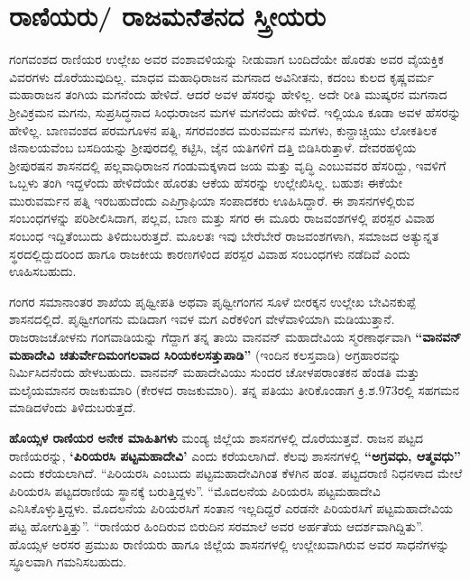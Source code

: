 \section{ರಾಣಿಯರು/ ರಾಜಮನೆತನದ ಸ್ತ್ರೀಯರು}

ಗಂಗವಂಶದ ರಾಣಿಯರ ಉಲ್ಲೇಖ ಅವರ ವಂಶಾವಳಿಯನ್ನು ನೀಡುವಾಗ ಬಂದಿದೆಯೇ ಹೊರತು ಅವರ ವೈಯಕ್ತಿಕ ವಿವರಗಳು ದೊರೆಯುವುದಿಲ್ಲ. ಮಾಧವ ಮಹಾಧಿರಾಜನ ಮಗನಾದ ಅವಿನೀತನು, ಕದಂಬ ಕುಲದ ಕೃಷ್ಣವರ್ಮ ಮಹಾರಾಜನ ತಂಗಿಯ ಮಗನೆಂದು ಹೇಳಿದೆ. ಆದರೆ ಅವಳ ಹೆಸರನ್ನು ಹೇಳಿಲ್ಲ. ಅದೇ ರೀತಿ ಮುಷ್ಕರನ ಮಗನಾದ ಶ‍್ರೀವಿಕ್ರಮನ ಮಗನು, ಸುಪ್ರಸಿದ್ಧನಾದ ಸಿಂಧುರಾಜನ ಮಗಳ ಮಗನೆಂದು ಹೇಳಿದೆ. ಇಲ್ಲಿಯೂ ಕೂಡಾ ಅವಳ ಹೆಸರನ್ನು ಹೇಳಿಲ್ಲ. ಬಾಣವಂಶದ ಪರಮಗೂಳನ ಪತ್ನಿ, ಸಗರವಂಶದ ಮರುವರ್ಮನ ಮಗಳು, ಕುನ್ದಾಚ್ಚಿಯು ಲೋಕತಿಲಕ ಜಿನಾಲಯವೆಂಬ ಬಸದಿಯನ್ನು ಶ‍್ರೀಪುರದಲ್ಲಿ ಕಟ್ಟಿಸಿ, ಜೈನ ಯತಿಗಳಿಗೆ ದತ್ತಿ ಬಿಡಿಸಿರುತ್ತಾಳೆ. ದೇವರಹಳ್ಳಿಯ ಶ‍್ರೀಪುರಷನ ಶಾಸನದಲ್ಲಿ ಪಲ್ಲವಾಧಿರಾಜನ ಗಂಡುಮಕ್ಕಳಾದ ಜಯ ಮತ್ತು ವೃದ್ಧಿ ಎಂಬುವವರ ಹೆಸರಿದ್ದು, ಇವಳಿಗೆ ಒಬ್ಬಳು ತಂಗಿ ಇದ್ದಳೆಂದು ಹೇಳಿದೆಯೇ ಹೊರತು ಆಕೆಯ ಹೆಸರನ್ನು ಉಲ್ಲೇಖಿಸಿಲ್ಲ. ಬಹುಶಃ ಈಕೆಯೇ ಮುರುವರ್ಮನ ಪತ್ನಿ ಇರಬಹುದೆಂದು ಎಪಿಗ್ರಾಫಿಯಾ ಸಂಪಾದಕರು ಊಹಿಸಿದ್ದಾರೆ. ಈ ಶಾಸನಗಳಲ್ಲಿರುವ ಸಂಬಂಧಗಳನ್ನು ಪರಿಶೀಲಿಸಿದಾಗ, ಪಲ್ಲವ, ಬಾಣ ಮತ್ತು ಸಗರ ಈ ಮೂರು ರಾಜವಂಶಗಳಲ್ಲಿ ಪರಸ್ಪರ ವಿವಾಹ ಸಂಬಂಧ ಇದ್ದಿತೆಂಬುದು ತಿಳಿದುಬರುತ್ತದೆ. ಮೂಲತಃ ಇವು ಬೇರೆಬೇರೆ ರಾಜವಂಶಗಳಾಗಿ, ಸಮಾಜದ ಅತ್ಯುನ್ನತ ಸ್ಥರದಲ್ಲಿದ್ದುದರಿಂದ ಹಾಗೂ ರಾಜಕೀಯ ಕಾರಣಗಳಿಂದ ಪರಸ್ಪರ ವಿವಾಹ ಸಂಬಂಧಗಳು ನಡೆದಿವೆ ಎಂದು ಊಹಿಸಬಹುದು.

\vskip 2pt

ಗಂಗರ ಸಮಾನಾಂತರ ಶಾಖೆಯ ಪೃಥ್ವೀಪತಿ ಅಥವಾ ಪೃಥ್ವೀಗಂಗನ ಸೂಳೆ ಬೀರಕ್ಕನ ಉಲ್ಲೇಖ ಬೇವಿನಕುಪ್ಪೆ ಶಾಸನದಲ್ಲಿದೆ. ಪೃಥ್ವೀಗಂಗನು ಮಡಿದಾಗ ಇವಳ ಮಗ ಎರೆಕಳಿಂಗ ವೇಳೆವಾಳಿಯಾಗಿ ಮಡಿಯುತ್ತಾನೆ. ರಾಜರಾಜಚೋಳನು ಗಂಗವಾಡಿಯನ್ನು ಗೆದ್ದಾಗ ತನ್ನ ತಾಯಿ ವಾನವನ್​ ಮಹಾದೇವಿಯ ಸ್ಮರಣಾರ್ಥವಾಗಿ \textbf{“ವಾನವನ್​ಮಹಾದೇವಿ\general{\break } ಚತುರ್ವೇದಿಮಂಗಲವಾದ ಸಿರಿಯಕಲಸತ್ತುಪಾಡಿ”} (ಇಂದಿನ ಕಲಸ್ತವಾಡಿ) ಅಗ್ರಹಾರವನ್ನು ನಿರ್ಮಿಸಿದನೆಂದು ಹೇಳ\-ಬಹುದು. ವಾನವನ್​ ಮಹಾದೇವಿಯು ಸುಂದರ ಚೋಳಪರಾಂತಕನ ಹೆಂಡತಿ ಮತ್ತು ಮಲೈಯಮಾನನ ರಾಜಕುಮಾರಿ (ಕೇರಳದ ರಾಜಕುಮಾರಿ). ತನ್ನ ಪತಿಯು ತೀರಿಕೊಂಡಾಗ ಕ್ರಿ.ಶ.973ರಲ್ಲಿ ಸಹಗಮನ ಮಾಡಿದಳೆಂದು ತಿಳಿದುಬರುತ್ತದೆ.

\vskip 2pt

\textbf{ಹೊಯ್ಸಳ ರಾಣಿಯರ ಅನೇಕ ಮಾಹಿತಿಗಳು} ಮಂಡ್ಯ ಜಿಲ್ಲೆಯ ಶಾಸನಗಳಲ್ಲಿ ದೊರೆಯುತ್ತವೆ. ರಾಜನ ಪಟ್ಟದ ರಾಣಿಯರನ್ನು, \textbf{‘ಪಿರಿಯರಸಿ ಪಟ್ಟಮಹಾದೇವಿ’} ಎಂದು ಕರೆಯಲಾಗಿದೆ. ಕೆಲವು ಶಾಸನಗಳಲ್ಲಿ \textbf{“ಅಗ್ರವಧು, ಆತ್ಮವಧು”} ಎಂದು ಕರೆಯಲಾಗಿದೆ. “ಪಿರಿಯರಸಿ ಎಂಬುದು ಪಟ್ಟಮಹಾದೇವಿಗಿಂತ ಕೆಳಗಿನ ಹಂತ. ಪಟ್ಟದರಾಣಿ ನಿಧನಳಾದ ಮೇಲೆ ಪಿರಿಯರಸಿ ಪಟ್ಟದರಾಣಿಯ ಸ್ಥಾನಕ್ಕೆ ಬರುತ್ತಿದ್ದಳು”. “ಮೊದಲನೆಯ ಪಿರಿಯರಸಿ ಪಟ್ಟಮಹಾದೇವಿ ಎನಿಸಿಕೊಳ್ಳುತ್ತಿದ್ದಳು. ಮೊದಲನೆಯ ಪಿರಿಯರಸಿಗೆ ಸಂತಾನ ಇಲ್ಲದಿದ್ದರೆ ಎರಡನೇ ಪಿರಿಯರಸಿಗೆ ಪಟ್ಟಮಹಾದೇವಿಯ ಪಟ್ಟ ಹೋಗುತ್ತಿತ್ತು”. “ರಾಣಿಯರ ಹಿಂದಿರುವ ಬಿರುದಿನ ಸರಮಾಲೆ ಅವರ ಅರ್ಹತೆಯ ಆದರ್ಶವಾಗಿದ್ದಿತು”. ಹೊಯ್ಸಳ ಅರಸರ ಪ್ರಮುಖ ರಾಣಿಯರು ಹಾಗೂ ಜಿಲ್ಲೆಯ ಶಾಸನಗಳಲ್ಲಿ ಉಲ್ಲೇಖವಾಗಿರುವ ಅವರ ಸಾಧನೆಗಳನ್ನು ಸ್ಥೂಲವಾಗಿ ಗಮನಿಸಬಹುದು.


